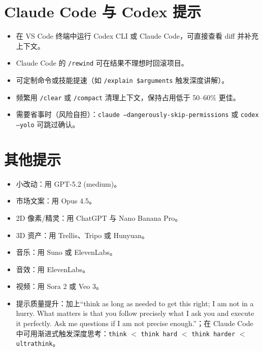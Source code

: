 \documentclass[12pt]{article}
\begin{document}
\section{Claude Code 与 Codex 提示}
\begin{itemize}
  \item 在 VS Code 终端中运行 Codex CLI 或 Claude Code，可直接查看 diff 并补充上下文。
  \item Claude Code 的 \texttt{/rewind} 可在结果不理想时回滚项目。
  \item 可定制命令或技能提速（如 \texttt{/explain \$arguments} 触发深度讲解）。
  \item 频繁用 \texttt{/clear} 或 \texttt{/compact} 清理上下文，保持占用低于 50--60\% 更佳。
  \item 需要省事时（风险自担）：\texttt{claude --dangerously-skip-permissions} 或 \texttt{codex --yolo} 可跳过确认。
\end{itemize}

\section{其他提示}
\begin{itemize}
  \item 小改动：用 GPT-5.2 (medium)。
  \item 市场文案：用 Opus 4.5。
  \item 2D 像素/精灵：用 ChatGPT 与 Nano Banana Pro。
  \item 3D 资产：用 Trellis、Tripo 或 Hunyuan。
  \item 音乐：用 Suno 或 ElevenLabs。
  \item 音效：用 ElevenLabs。
  \item 视频：用 Sora 2 或 Veo 3。
  \item 提示质量提升：加上“think as long as needed to get this right; I am not in a hurry. What matters is that you follow precisely what I ask you and execute it perfectly. Ask me questions if I am not precise enough.”；在 Claude Code 中可用渐进式触发深度思考：\texttt{think} $<$ \texttt{think hard} $<$ \texttt{think harder} $<$ \texttt{ultrathink}。
\end{itemize}
\end{document}
